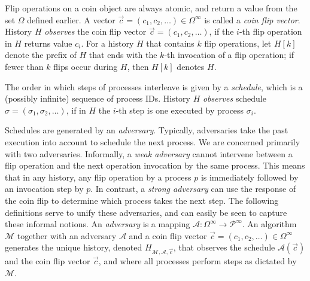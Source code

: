 \documentclass[11pt,letterpaper]{article}
\renewcommand{\AA}{\mathcal{A}}
\newcommand{\MM}{\mathcal{M}}
\newcommand{\PP}{\mathcal{P}}
\newcommand{\vc}{{\vec{c}}}
\begin{document}
Flip operations on a coin object are always atomic,
and return a value from the set $\Omega$ defined earlier.
A vector $\vc=(c_1,c_2,\dots)\in\Omega^\infty$ is called a \emph{coin flip vector}.
History $H$ \emph{observes} the coin flip vector $\vc=(c_1,c_2,\dots)$,
if the $i$-th flip operation in $H$ returns value $c_i$.
For a history $H$ that contains $k$ flip operations,
let $H[k]$ denote the prefix of $H$ that ends with the $k$-th invocation of a flip operation; if fewer than $k$ flips occur during $H$, then $H[k]$ denotes $H$.

The order in which steps of processes interleave is given by a
\emph{schedule}, which is a (possibly infinite) sequence of process IDs.
History $H$ \emph{observes} schedule $\sigma=(\sigma_1,\sigma_2,\dots)$,
if in $H$ the $i$-th step is one executed by process $\sigma_i$.

Schedules are generated by an \emph{adversary}.
Typically, adversaries take the past execution into account to schedule the next process.
We are concerned primarily with two adversaries.
Informally, a \emph{weak adversary} cannot intervene between a flip operation and the next operation invocation by the same process.
This means that in any history, any flip operation by a process $p$ is immediately followed by an invocation step by $p$.
In contrast, a \emph{strong adversary} can use the response of the coin flip to determine which process takes the next step.
The following definitions serve to unify these adversaries, and can easily be seen to capture these informal notions.
An \emph{adversary} is a mapping $\AA:\Omega^\infty\to\PP^\infty$.
An algorithm $\MM$ together with an adversary $\AA$ and a coin flip vector $\vc=(c_1,c_2,\dots)\in\Omega^\infty$
generates the unique history, denoted $H_{\MM,\AA,\vc}$,
that observes the schedule $\AA(\vc)$ and the coin flip vector $\vc$,
and where  all processes perform steps as dictated by $\MM$.
\end{document}
